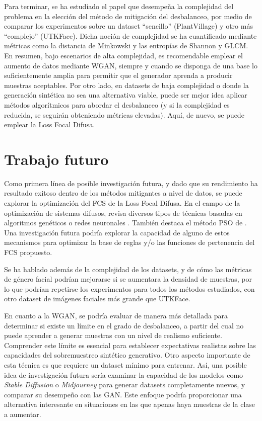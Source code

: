 Para terminar, se ha estudiado el papel que desempeña la complejidad del problema en la elección del método de mitigación del desbalanceo, por medio de comparar los experimentos sobre un dataset ``sencillo'' (PlantVillage) y otro más ``complejo'' (UTKFace). Dicha noción de complejidad se ha cuantificado mediante métricas como la distancia de Minkowski y las entropías de Shannon y GLCM. En resumen, bajo escenarios de alta complejidad, es recomendable emplear el aumento de datos mediante WGAN, siempre y cuando se disponga de una base lo suficientemente amplia para permitir que el generador aprenda a producir muestras aceptables. Por otro lado, en datasets de baja complejidad o donde la generación sintética no sea una alternativa viable, puede ser mejor idea aplicar métodos algorítmicos para abordar el desbalanceo (y si la complejidad es reducida, se seguirán obteniendo métricas elevadas). Aquí, de nuevo, se puede emplear la Loss Focal Difusa.


\section{Trabajo futuro\label{SEC:FUTUREWORK}}

Como primera línea de posible investigación futura, y dado que su rendimiento ha resultado exitoso dentro de los métodos mitigantes a nivel de datos, se puede explorar la optimización del FCS de la Loss Focal Difusa. En el campo de la optimización de sistemas difusos, \citet{alcala1999techniques} revisa diversos tipos de técnicas basadas en algoritmos genéticos \cite{kang2006optimization} o redes neuronales \cite{jang1993anfis}. También destaca el método PSO de \citet{esmin2002particle}. Una investigación futura podría explorar la capacidad de alguno de estos mecanismos para optimizar la base de reglas y/o las funciones de pertenencia del FCS propuesto.

Se ha hablado además de la complejidad de los datasets, y de cómo las métricas de género facial podrían mejorarse si se aumentara la densidad de muestras, por lo que podrían repetirse los experimentos para todos los métodos estudiados, con otro dataset de imágenes faciales más grande que UTKFace.

En cuanto a la WGAN, se podría evaluar de manera más detallada para determinar si existe un límite en el grado de desbalanceo, a partir del cual no puede aprender a generar muestras con un nivel de realismo suficiente. Comprender este límite es esencial para establecer expectativas realistas sobre las capacidades del sobremuestreo sintético generativo. Otro aspecto importante de esta técnica es que requiere un dataset mínimo para entrenar. Así, una posible idea de investigación futura sería examinar la capacidad de los modelos como \textit{Stable Diffusion} \cite{rombach2022high} o \textit{Midjourney} \cite{oppenlaender2022creativity} para generar datasets completamente nuevos, y comparar su desempeño con las GAN. Este enfoque podría proporcionar una alternativa interesante en situaciones en las que apenas haya muestras de la clase a aumentar.

